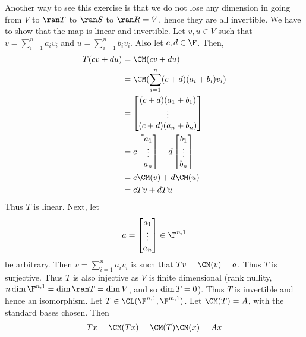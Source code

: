 \documentclass{book}
\begin{document}
\begin{enumerate}[label=\arabic*)]
      Another way to see this exercise is that we do not lose any dimension in going from $V$ to $\ran T$ to $\ran S$ to $\ran R = V$, hence they are all invertible.
    \ii
      We have to show that the map is linear and invertible. Let $v, u \in V$ such that $v = \sum_{i = 1}^{n}a_iv_i$ and $u = \sum_{i = 1}^{n}b_iv_i$. Also let $c, d \in \F$. Then,
      \begin{align*}
        T(cv + du) & = \CM(cv + du) \\
        & = \CM(\sum_{i = 1}^{n}(c + d)(a_i + b_i)v_i) \\
        & = 
        \begin{bmatrix}
          (c + d)(a_1 + b_1) \\
          \vdots \\
          (c + d)(a_n + b_n) 
        \end{bmatrix} \\
        & = 
        c \begin{bmatrix}
          a_1 \\
          \vdots \\
          a_n
        \end{bmatrix} + d \begin{bmatrix}
          b_1 \\
          \vdots \\
          b_n
        \end{bmatrix}\\
        & = c\CM(v) + d\CM(u) \\
        & = cTv + dTu
      \end{align*}
      Thus $T$ is linear. Next, let 
      \begin{align*}
        a = \begin{bmatrix}
          a_1 \\
          \vdots \\
          a_n
        \end{bmatrix} \in \F^{n, 1}
      \end{align*}
      be arbitrary. Then $v = \sum_{i = 1}^{n}a_iv_i$ is such that $Tv = \CM(v) = a$. Thus $T$ is surjective. Thus $T$ is also injective as $V$ is finite dimensional (rank nullity, $n \dim
      \F^{n, 1} = \dim\ran T = \dim V$, and so $\dim\null T = 0$). Thus $T$ is invertible and hence an isomorphism.
    \ii
      Let $T \in \CL(\F^{n, 1}, \F^{m, 1})$. Let $\CM(T) = A$, with the standard bases chosen. Then 
      \begin{align*}
        Tx = \CM(Tx) = \CM(T)\CM(x) = Ax 

\end{align*}
\end{enumerate}
\end{document}

